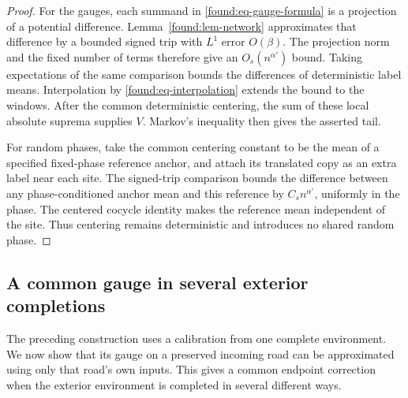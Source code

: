 \begin{proof}
For the gauges, each summand in \eqref{found:eq-gauge-formula} is a
projection of a potential difference.  Lemma~\ref{found:lem-network}
approximates that difference by a bounded signed trip with $L^1$
error $O(\beta)$.  The projection norm and the fixed number of terms
therefore give an $O_s(n^{\alpha'})$ bound.  Taking expectations of
the same comparison bounds the differences of deterministic label
means.  Interpolation by \eqref{found:eq-interpolation} extends the
bound to the windows.  After the common deterministic centering, the
sum of these local absolute suprema supplies $V$.  Markov's inequality
then gives the asserted tail.

For random phases, take the common centering constant to be the mean
of a specified fixed-phase reference anchor, and attach its translated
copy as an extra label near each site.  The signed-trip comparison
bounds the difference between any phase-conditioned anchor mean and
this reference by $C_s n^{\alpha'}$, uniformly in the phase.  The
centered cocycle identity makes the reference mean independent of the
site.  Thus centering remains deterministic and introduces no shared
random phase.
\end{proof}

\subsection{A common gauge in several exterior completions}

The preceding construction uses a calibration from one complete
environment.  We now show that its gauge on a preserved incoming road
can be approximated using only that road's own inputs.  This gives a
common endpoint correction when the exterior environment is completed
in several different ways.

